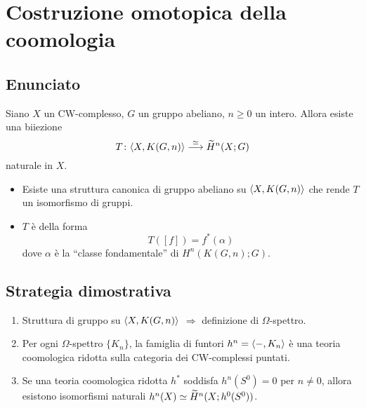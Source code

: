 \documentclass[9pt]{beamer}
\begin{document}
\section*{Costruzione omotopica della coomologia}
\subsection*{Enunciato}
\begin{frame*}
\begin{theorem}
Siano $X$ un CW-complesso, $G$ un gruppo abeliano, $n\ge 0$ un intero. Allora esiste una biiezione
\[
\map[\iso]{T}{\hmaps{X,K(G,n)}}{\til{H}^n(X;G)}
\]
naturale in $X$.
\end{theorem}
\begin{itemize}
\item Esiste una struttura canonica di gruppo abeliano su $\langle X,K(G,n)\rangle$ che rende $T$ un isomorfismo di gruppi.
\item $T$ è della forma
\[
T([f])=f^*(\alpha)
\]
dove $\alpha$ è la ``classe fondamentale'' di $H^n(K(G,n);G)$.
\end{itemize}
\end{frame*}

\subsection*{Strategia dimostrativa}
\begin{frame*}
\begin{enumerate}
\addtolength\itemsep{1em}
\item Struttura di gruppo su $\langle X,K(G,n)\rangle$ $\Longrightarrow$ definizione di $\Omega$-spettro.
\item Per ogni $\Omega$-spettro $\{K_n\}$, la famiglia di funtori $h^n=\langle -,K_n\rangle$ è una teoria coomologica ridotta sulla categoria dei CW-complessi puntati.
\item Se una teoria coomologica ridotta $h^*$ soddisfa $h^n(S^0)=0$ per $n\neq 0$, allora esistono isomorfismi naturali $h^n(X)\simeq\widetilde{H}^n(X;h^0(S^0))$.
\end{enumerate}
\end{frame*}




\end{document}
